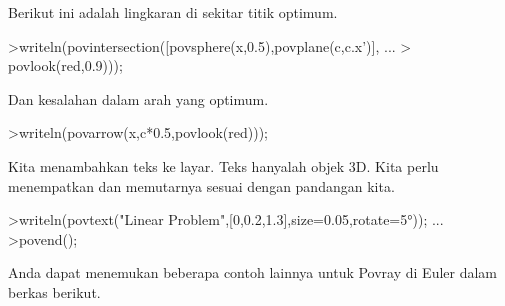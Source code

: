 \documentclass[a4paper,10pt]{article}
\begin{document}
\begin{eulernotebook}
\begin{eulercomment}
\begin{eulercomment}
\begin{eulercomment}
\begin{eulercomment}
\begin{eulercomment}
\begin{eulercomment}
\begin{eulercomment}
\begin{eulercomment}
\begin{eulercomment}
\begin{eulercomment}
\begin{eulercomment}
\begin{eulercomment}
\begin{eulercomment}
\begin{eulercomment}
\begin{eulercomment}
\begin{eulercomment}
\begin{eulercomment}
\begin{eulercomment}
\begin{eulercomment}
\begin{eulercomment}
\begin{eulercomment}
\begin{eulercomment}
\begin{eulercomment}
\begin{eulercomment}
\begin{eulercomment}
\begin{eulercomment}
\begin{eulercomment}
\begin{eulercomment}
\begin{eulercomment}
\begin{eulercomment}
\begin{eulercomment}
\begin{eulercomment}
\begin{eulercomment}
\begin{eulercomment}
\begin{eulercomment}
\begin{eulercomment}
\begin{eulercomment}
\begin{eulercomment}
\begin{eulercomment}
\begin{eulercomment}
\begin{eulercomment}
Berikut ini adalah lingkaran di sekitar titik optimum.
\end{eulercomment}
\begin{eulerprompt}
>writeln(povintersection([povsphere(x,0.5),povplane(c,c.x')], ...
>  povlook(red,0.9)));
\end{eulerprompt}
\begin{eulercomment}
Dan kesalahan dalam arah yang optimum.
\end{eulercomment}
\begin{eulerprompt}
>writeln(povarrow(x,c*0.5,povlook(red)));
\end{eulerprompt}
\begin{eulercomment}
Kita menambahkan teks ke layar. Teks hanyalah objek 3D. Kita perlu
menempatkan dan memutarnya sesuai dengan pandangan kita.
\end{eulercomment}
\begin{eulerprompt}
>writeln(povtext("Linear Problem",[0,0.2,1.3],size=0.05,rotate=5°)); ...
>povend();
\end{eulerprompt}
\begin{eulercomment}
Anda dapat menemukan beberapa contoh lainnya untuk Povray di Euler
dalam berkas berikut.


\end{eulercomment}
\end{eulercomment}
\end{eulercomment}
\end{eulercomment}
\end{eulercomment}
\end{eulercomment}
\end{eulercomment}
\end{eulercomment}
\end{eulercomment}
\end{eulercomment}
\end{eulercomment}
\end{eulercomment}
\end{eulercomment}
\end{eulercomment}
\end{eulercomment}
\end{eulercomment}
\end{eulercomment}
\end{eulercomment}
\end{eulercomment}
\end{eulercomment}
\end{eulercomment}
\end{eulercomment}
\end{eulercomment}
\end{eulercomment}
\end{eulercomment}
\end{eulercomment}
\end{eulercomment}
\end{eulercomment}
\end{eulercomment}
\end{eulercomment}
\end{eulercomment}
\end{eulercomment}
\end{eulercomment}
\end{eulercomment}
\end{eulercomment}
\end{eulercomment}
\end{eulercomment}
\end{eulercomment}
\end{eulercomment}
\end{eulercomment}
\end{eulercomment}
\end{eulernotebook}
\end{document}
